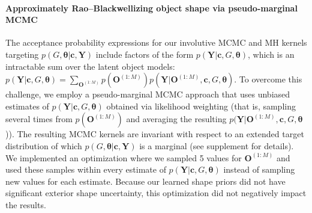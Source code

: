 \paragraph{Approximately Rao--Blackwellizing object shape via pseudo-marginal MCMC}
The acceptance probability expressions for our involutive MCMC and MH kernels targeting $p(G, \bm\theta | \mathbf{c}, \mathbf{Y})$ include factors of the form $p(\mathbf{Y} | \mathbf{c}, G, \bm{\theta})$, which is an intractable sum over the latent object models:
$p(\mathbf{Y} | \mathbf{c}, G, \bm{\theta}) = \sum_{\mathbf{O}^{(1:M)}} p(\mathbf{O}^{(1:M)}) p(\mathbf{Y} | \mathbf{O}^{(1:M)}, \mathbf{c}, G, \bm{\theta})$.
To overcome this challenge, we employ a pseudo-marginal MCMC approach \citep{andrieu2009pseudo} that uses unbiased estimates of
$p(\mathbf{Y} | \mathbf{c}, G, \bm{\theta})$
obtained via likelihood weighting (that is, sampling several times from $p(\mathbf{O}^{(1:M)})$ and averaging the resulting $p(\mathbf{Y} | \mathbf{O}^{(1:M)}, \mathbf{c}, G, \bm\theta$)).
The resulting MCMC kernels are invariant with respect to an extended target distribution of which $p(G, \bm\theta | \mathbf{c}, \mathbf{Y})$ is a marginal (see supplement for details). %
We implemented an optimization where we sampled 5 values for $\mathbf{O}^{(1:M)}$ and used these samples within every estimate of $p(\mathbf{Y} | \mathbf{c}, G, \bm\theta)$ instead of sampling new values for each estimate.
Because our learned shape priors did not have significant exterior shape uncertainty,
this optimization did not negatively impact the results.


